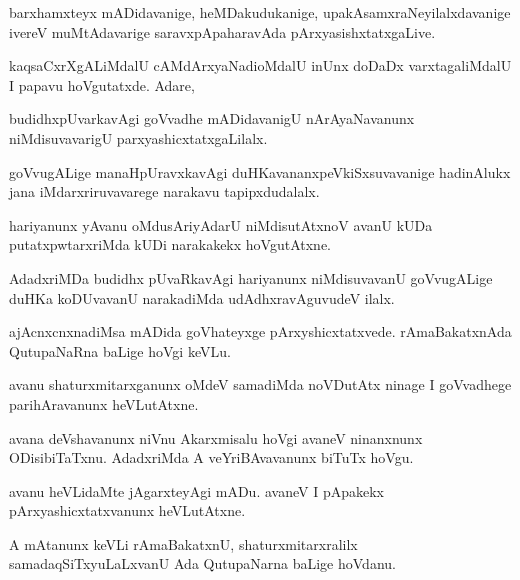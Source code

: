 \documentclass{article}
\begin{document}
\begin{mn}%
barxhamxteyx mADidavanige, heMDakudukanige, upakAsamxraNeyilalxdavanige ivereV 
muMtAdavarige saravxpApaharavAda pArxyasishxtatxgaLive.
\end{mn}

\begin{mn}%
kaqsaCxrXgALiMdalU cAMdArxyaNadioMdalU inUnx doDaDx varxtagaliMdalU I papavu hoVgutatxde. 
Adare,
\end{mn}

\begin{mn}%
budidhxpUvarkavAgi goVvadhe mADidavanigU nArAyaNavanunx niMdisuvavarigU 
parxyashicxtatxgaLilalx.
\end{mn}

\begin{mn}%
goVvugALige manaHpUravxkavAgi duHKavananxpeVkiSxsuvavanige hadinAlukx jana iMdarxriruvavarege
narakavu tapipxdudalalx.
\end{mn}

\begin{mn}%
hariyanunx yAvanu oMdusAriyAdarU niMdisutAtxnoV avanU kUDa putatxpwtarxriMda kUDi narakakekx 
hoVgutAtxne.
\end{mn}

\begin{mn}%
AdadxriMDa budidhx pUvaRkavAgi hariyanunx niMdisuvavanU goVvugALige duHKa koDUvavanU 
narakadiMda udAdhxravAguvudeV ilalx.
\end{mn}

\begin{mn}%
ajAcnxcnxnadiMsa mADida goVhateyxge pArxyshicxtatxvede. rAmaBakatxnAda QutupaNaRna baLige 
hoVgi keVLu.
\end{mn}

\begin{mn}%
avanu shaturxmitarxganunx oMdeV samadiMda noVDutAtx ninage I goVvadhege parihAravanunx 
heVLutAtxne.
\end{mn}

\begin{mn}%
avana deVshavanunx niVnu Akarxmisalu hoVgi avaneV ninanxnunx ODisibiTaTxnu. AdadxriMda A 
veYriBAvavanunx biTuTx hoVgu.
\end{mn}

\begin{mn}%
avanu heVLidaMte jAgarxteyAgi mADu. avaneV I pApakekx pArxyashicxtatxvanunx heVLutAtxne.
\end{mn}

\begin{mn}%
A mAtanunx keVLi rAmaBakatxnU, shaturxmitarxralilx samadaqSiTxyuLaLxvanU Ada QutupaNarna 
baLige hoVdanu.
\end{mn}
\end{document}
